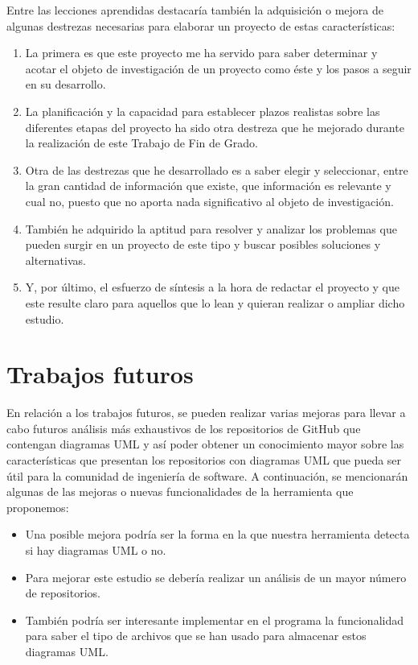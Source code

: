 \documentclass[a4paper, 12pt]{book}
\begin{document}
Entre las lecciones aprendidas destacaría también la adquisición o mejora de algunas destrezas necesarias para elaborar un proyecto de estas características:
\begin{enumerate}
  \item  La primera es que este proyecto me ha servido para saber determinar y acotar el objeto de investigación de un proyecto como éste y los pasos a seguir en su desarrollo.
  \item  La planificación y la capacidad para establecer plazos realistas sobre las diferentes etapas del proyecto ha sido otra destreza que he mejorado durante la realización de este Trabajo de Fin de Grado.
  \item  Otra de las destrezas que he desarrollado es a saber elegir y seleccionar, entre la gran cantidad de información que existe, que información es relevante y cual no, puesto que no aporta nada significativo al objeto de investigación.
  \item  También he adquirido la aptitud para resolver y analizar los problemas que pueden surgir en un proyecto de este tipo y buscar posibles soluciones y alternativas.  
  \item  Y, por último, el esfuerzo de síntesis a la hora de redactar el proyecto y que este resulte claro para aquellos que lo lean y quieran realizar o ampliar dicho estudio. 
\end{enumerate}

\section{Trabajos futuros}
\label{sec:trabajos_futuros}


En relación a los trabajos futuros, se pueden realizar varias mejoras para llevar a cabo futuros análisis más exhaustivos de los repositorios de GitHub que contengan diagramas UML y así poder obtener un conocimiento mayor sobre las características que presentan los repositorios con diagramas UML que pueda ser útil para la comunidad de ingeniería de software. 
A continuación, se mencionarán algunas de las mejoras o nuevas funcionalidades de la herramienta que proponemos:

\begin{itemize}
  \item  Una posible mejora podría ser la forma en la que nuestra herramienta detecta si hay diagramas UML o no.
  \item  Para mejorar este estudio se debería realizar un análisis de un mayor número de repositorios.
  \item  También podría ser interesante implementar en el programa la funcionalidad para saber el tipo de archivos que se han usado para almacenar estos diagramas UML.
\end{itemize}
\end{document}
